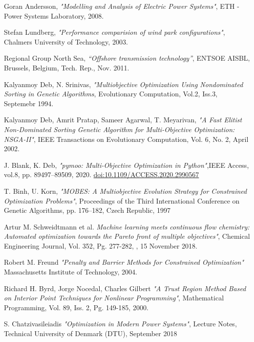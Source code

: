 \documentclass[a4paper,11pt, titlepage, twoside]{article}
\begin{document}
\begin{thebibliography}{99}
{Goran Andersson},
\textit{"Modelling and Analysis of Electric Power Systems"}, ETH - Power Systems Laboratory, 2008.

{Stefan Lundberg},
\textit{"Performance comparision of wind park configurations"}, Chalmers University of Technology, 2003.

{Regional Group North Sea},
\textit{“Offshore transmission technology”}, ENTSOE AISBL, Brussels, Belgium, Tech. Rep., Nov. 2011.



{Kalyanmoy Deb, N. Srinivas},
\textit{"Multiobjective Optimization Using Nondominated Sorting in Genetic Algorithms}, Evolutionary Computation, Vol.2, Iss.3, Septemebr 1994.

{Kalyanmoy Deb, Amrit Pratap, Sameer Agarwal, T. Meyarivan},
\textit{"A Fast Elitist Non-Dominated Sorting Genetic Algorithm for Multi-Objective Optimization: NSGA-II"}, IEEE Transactions on Evolutionary Computation, Vol. 6, No. 2, April 2002.

{J. Blank, K. Deb},
\textit{"pymoo: Multi-Objective Optimization in Python"},IEEE Access, vol.8, pp. 89497–89509, 2020. \href{https://ieeexplore.ieee.org/document/9078759}{doi:10.1109/ACCESS.2020.2990567}

{T. Binh, U. Korn},
\textit{"MOBES: A Multiobjective Evolution Strategy for Constrained Optimization Problems"}, Proceedings of the Third International Conference on Genetic Algorithms, 
pp. 176–182, Czech Republic, 1997

{Artur M. Schweidtmann et al.}
\textit{Machine learning meets continuous flow chemistry: Automated
optimization towards the Pareto front of multiple objectives"}, Chemical Engineering Journal, Vol. 352, Pg. 277-282, , 15 November 2018.

{Robert M. Freund}
\textit{"Penalty and Barrier Methods for Constrained Optimization"} Massachusetts Institute of Technology, 2004.

{Richard H. Byrd, Jorge Nocedal, Charles Gilbert}
\textit{"A Trust Region Method Based on Interior Point Techniques for Nonlinear Programming"}, Mathematical Programming, Vol. 89, Iss. 2, Pg. 149-185, 2000.
 

{S. Chatzivasileiadis}
\textit{"Optimization in Modern Power Systems"}, Lecture Notes, Technical University of Denmark (DTU), September 2018


\end{thebibliography}
\end{document}
